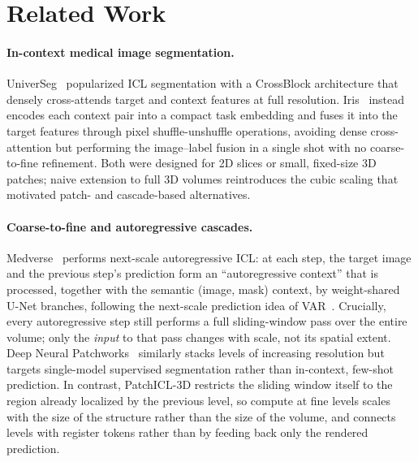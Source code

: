 \section{Related Work}
\label{sec:related}

\paragraph{In-context medical image segmentation.}
UniverSeg~\cite{butoiUniverSegUniversalMedical2023} popularized ICL
segmentation with a CrossBlock architecture that densely cross-attends
target and context features at full resolution. Iris~\cite{gaoShowSegmentUniversal2025}
instead encodes each context pair into a compact task embedding and
fuses it into the target features through pixel shuffle-unshuffle
operations, avoiding dense cross-attention but performing the
image--label fusion in a single shot with no coarse-to-fine refinement.
Both were designed for 2D slices or small, fixed-size 3D patches; naive
extension to full 3D volumes reintroduces the cubic scaling that
motivated patch- and cascade-based alternatives.

\paragraph{Coarse-to-fine and autoregressive cascades.}
Medverse~\cite{huMedverseUniversalModel2025a} performs next-scale
autoregressive ICL: at each step, the target image and the previous
step's prediction form an ``autoregressive context'' that is processed,
together with the semantic (image, mask) context, by weight-shared U-Net
branches, following the next-scale prediction idea of
VAR~\cite{tian2024visual}. Crucially, every autoregressive step still
performs a full sliding-window pass over the entire volume; only the
\emph{input} to that pass changes with scale, not its spatial extent.
Deep Neural Patchworks~\cite{reisertDeepNeuralPatchworks2022a} similarly
stacks levels of increasing resolution but targets single-model
supervised segmentation rather than in-context, few-shot prediction. In
contrast, PatchICL-3D restricts the sliding window itself to the region
already localized by the previous level, so compute at fine levels
scales with the size of the structure rather than the size of the
volume, and connects levels with register tokens rather than by feeding
back only the rendered prediction.

